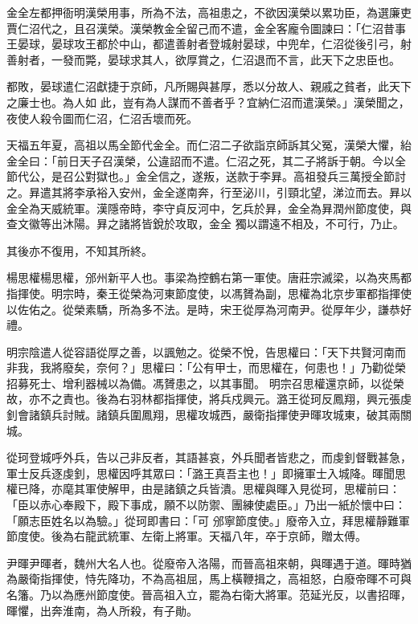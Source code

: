 \begin{pinyinscope}
 金全左都押衙明漢榮用事，所為不法，高祖患之，不欲因漢榮以累功臣，為選廉吏賈仁沼代之，且召漢榮。漢榮教金全留己而不遣，金全客龐令圖諫曰：「仁沼昔事王晏球，晏球攻王都於中山，都遣善射者登城射晏球，中兜牟，仁沼從後引弓，射善射者，一發而斃，晏球求其人，欲厚賞之，仁沼退而不言，此天下之忠臣也。



 都敗，晏球遣仁沼獻捷于京師，凡所賜與甚厚，悉以分故人、親戚之貧者，此天下之廉士也。為人如
 此，豈有為人謀而不善者乎？宜納仁沼而遣漢榮。」漢榮聞之，夜使人殺令圖而仁沼，仁沼舌壞而死。



 天福五年夏，高祖以馬全節代金全。而仁沼二子欲詣京師訴其父冤，漢榮大懼，紿金全曰：「前日天子召漢榮，公違詔而不遣。仁沼之死，其二子將訴于朝。今以全節代公，是召公對獄也。」金全信之，遂叛，送款于李昪。高祖發兵三萬授全節討之。昪遣其將李承裕入安州，金全遂南奔，行至泌川，引頸北望，涕泣而去。昪以金全為天威統軍。漢隱帝時，李守貞反河中，乞兵於昪，金全為昪潤州節度使，與查文徽等出沐陽。昪之諸將皆銳於攻取，金全
 獨以謂遠不相及，不可行，乃止。



 其後亦不復用，不知其所終。



 楊思權楊思權，邠州新平人也。事梁為控鶴右第一軍使。唐莊宗滅梁，以為夾馬都指揮使。明宗時，秦王從榮為河東節度使，以馮贇為副，思權為北京步軍都指揮使以佐佑之。從榮素驕，所為多不法。是時，宋王從厚為河南尹。從厚年少，謙恭好禮。



 明宗陰遣人從容語從厚之善，以諷勉之。從榮不悅，告思權曰：「天下共賢河南而非我，我將廢矣，奈何？」思權曰：「公有甲士，而思權在，何患也！」乃勸從榮招募死士、增利器械以為備。馮贇患之，以其事聞。
 明宗召思權還京師，以從榮故，亦不之責也。後為右羽林都指揮使，將兵戍興元。潞王從珂反鳳翔，興元張虔釗會諸鎮兵討賊。諸鎮兵圍鳳翔，思權攻城西，嚴衛指揮使尹暉攻城東，破其兩關城。



 從珂登城呼外兵，告以己非反者，其語甚哀，外兵聞者皆悲之，而虔釗督戰甚急，軍士反兵逐虔釗，思權因呼其眾曰：「潞王真吾主也！」即擁軍士入城降。暉聞思權已降，亦麾其軍使解甲，由是諸鎮之兵皆潰。思權與暉入見從珂，思權前曰：「臣以赤心奉殿下，殿下事成，願不以防禦、團練使處臣。」乃出一紙於懷中曰：「願志臣姓名以為驗。」從珂即書曰：「可
 邠寧節度使。」廢帝入立，拜思權靜難軍節度使。後為右龍武統軍、左衛上將軍。天福八年，卒于京師，贈太傅。



 尹暉尹暉者，魏州大名人也。從廢帝入洛陽，而晉高祖來朝，與暉遇于道。暉時猶為嚴衛指揮使，恃先降功，不為高祖屈，馬上橫鞭揖之，高祖怒，白廢帝暉不可與名籓。乃以為應州節度使。晉高祖入立，罷為右衛大將軍。范延光反，以書招暉，暉懼，出奔淮南，為人所殺，有子勛。




\end{pinyinscope}

